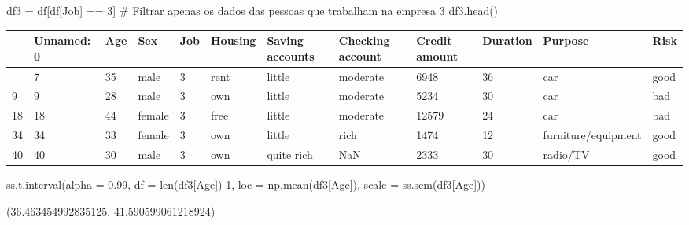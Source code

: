 \documentclass[
  letterpaper,
  DIV=11,
  numbers=noendperiod]{scrreprt}
\newenvironment{Shaded}{\begin{snugshade}}{\end{snugshade}}
\newcommand{\BuiltInTok}[1]{\textcolor[rgb]{0.00,0.23,0.31}{#1}}
\newcommand{\CommentTok}[1]{\textcolor[rgb]{0.37,0.37,0.37}{#1}}
\newcommand{\DecValTok}[1]{\textcolor[rgb]{0.68,0.00,0.00}{#1}}
\newcommand{\FloatTok}[1]{\textcolor[rgb]{0.68,0.00,0.00}{#1}}
\newcommand{\NormalTok}[1]{\textcolor[rgb]{0.00,0.23,0.31}{#1}}
\newcommand{\OperatorTok}[1]{\textcolor[rgb]{0.37,0.37,0.37}{#1}}
\newcommand{\StringTok}[1]{\textcolor[rgb]{0.13,0.47,0.30}{#1}}
\begin{document}
\begin{Shaded}
\begin{Highlighting}[]
\NormalTok{df3 }\OperatorTok{=}\NormalTok{ df[df[}\StringTok{\textquotesingle{}Job\textquotesingle{}}\NormalTok{] }\OperatorTok{==} \DecValTok{3}\NormalTok{] }\CommentTok{\# Filtrar apenas os dados das pessoas que trabalham na empresa 3}
\NormalTok{df3.head()}
\end{Highlighting}
\end{Shaded}

\begin{longtable}[]{@{}llllllllllll@{}}
\toprule\noalign{}
& Unnamed: 0 & Age & Sex & Job & Housing & Saving accounts & Checking
account & Credit amount & Duration & Purpose & Risk \\
\midrule\noalign{}
\endhead
\bottomrule\noalign{}
\endlastfoot
7 & 7 & 35 & male & 3 & rent & little & moderate & 6948 & 36 & car &
good \\
9 & 9 & 28 & male & 3 & own & little & moderate & 5234 & 30 & car &
bad \\
18 & 18 & 44 & female & 3 & free & little & moderate & 12579 & 24 & car
& bad \\
34 & 34 & 33 & female & 3 & own & little & rich & 1474 & 12 &
furniture/equipment & good \\
40 & 40 & 30 & male & 3 & own & quite rich & NaN & 2333 & 30 & radio/TV
& good \\
\end{longtable}

\begin{Shaded}
\begin{Highlighting}[]
\NormalTok{ss.t.interval(alpha }\OperatorTok{=} \FloatTok{0.99}\NormalTok{, df }\OperatorTok{=} \BuiltInTok{len}\NormalTok{(df3[}\StringTok{\textquotesingle{}Age\textquotesingle{}}\NormalTok{])}\OperatorTok{{-}}\DecValTok{1}\NormalTok{, loc }\OperatorTok{=}\NormalTok{ np.mean(df3[}\StringTok{\textquotesingle{}Age\textquotesingle{}}\NormalTok{]), scale }\OperatorTok{=}\NormalTok{ ss.sem(df3[}\StringTok{\textquotesingle{}Age\textquotesingle{}}\NormalTok{]))}
\end{Highlighting}
\end{Shaded}

\begin{tcolorbox}[enhanced jigsaw, breakable, leftrule=.75mm, left=2mm, opacityback=0, bottomrule=.15mm, toprule=.15mm, rightrule=.15mm, arc=.35mm, colback=white]

(36.463454992835125, 41.590599061218924)

\end{tcolorbox}
\end{document}
